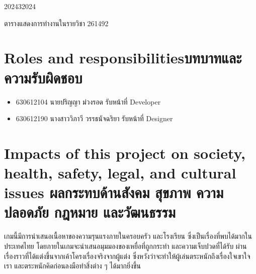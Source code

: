 \begin{plan}{1}{2024}{3}{2024}
    \caption[ตารางการทำงานรายวิชา 261492]{ตารางแสดงการทำงานในรายวิชา 261492}
\end{plan}

\section{\ifenglish Roles and responsibilities\else บทบาทและความรับผิดชอบ\fi}
\begin{itemize}
    \item[] 630612104 นายปริญญา ม่วงรอด รับหน้าที่ Developer
    \item[] 630612190 นางสาววิภาวี วรรธนัจฉริยา รับหน้าที่ Designer
\end{itemize}

\section{\ifenglish%
      Impacts of this project on society, health, safety, legal, and cultural issues
  \else%
      ผลกระทบด้านสังคม สุขภาพ ความปลอดภัย กฎหมาย และวัฒนธรรม
  \fi}

เกมนี้มีการนำเสนอเนื้อหาของความรุนแรงภายในครอบครัว และโรงเรียน ซึ่งเป็นเรื่องที่พบได้มากในประเทศไทย 
โดยภายในเกมจะนำเสนอมุมมองของเหยื่อที่ถูกกระทำ และความเจ็บปวดที่ได้รับ ผ่านเรื่องราวที่ได้แต่งขึ้นจากเค้าโครงเรื่องจริงจากผู้แต่ง
ซึ่งหวังว่าจะทำให้ผู้เล่นตระหนักถึงเรื่องใจเขาใจเรา และตระหนักคิดก่อนลงมือทำสิ่งต่าง ๆ ได้มากยิ่งขึ้น

